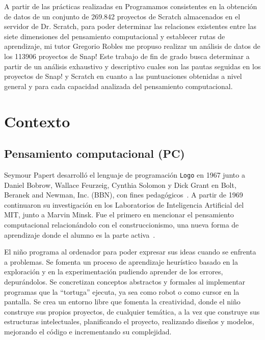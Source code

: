 \documentclass[a4paper, 12pt]{book}
\begin{document}
A partir de las prácticas realizadas en Programamos consistentes en la obtención de datos de un conjunto de 269.842 proyectos de Scratch almacenados en el servidor de Dr. Scratch, para poder determinar las relaciones existentes entre las siete dimensiones del pensamiento computacional y establecer rutas de aprendizaje, mi tutor Gregorio Robles me propuso realizar un análisis de datos de los 113906 proyectos de Snap! Este trabajo de fin de grado busca determinar a partir de un análisis exhaustivo y descriptivo cuales son las pautas seguidas en los proyectos de Snap! y Scratch en cuanto a las puntuaciones obtenidas a nivel general y para cada capacidad analizada del pensamiento computacional. 

\section{Contexto}
\label{sec:contexto}

\subsection{Pensamiento computacional (PC)}
\label{subsec:pc}
Seymour Papert desarrolló el lenguaje de programación \texttt{Logo} en 1967 junto a Daniel Bobrow, Wallace Feurzeig, Cynthia Solomon y Dick Grant en Bolt, Beranek and Newman, Inc. (BBN), con fines pedagógicos~\cite{solomon20:_history}. A partir de 1969 continuaron su investigación en los Laboratorios de Inteligencia Artificial del MIT, junto a Marvin Minsk. Fue el primero en mencionar el pensamiento computacional relacionándolo con el construccionismo, una nueva forma de aprendizaje donde el alumno es la parte activa~\cite{papert80:_mindstorm}.

El niño programa al ordenador para poder expresar sus ideas cuando se enfrenta a problemas. Se fomenta un proceso de aprendizaje heurístico basado en la exploración y en la experimentación pudiendo aprender de los errores, depurándolos. Se concretizan conceptos abstractos y formales al implementar programas que la ``tortuga'' ejecuta, ya sea como robot o como cursor en la pantalla. Se crea un entorno libre que fomenta la creatividad, donde el niño construye sus propios proyectos, de cualquier temática, a la vez que construye sus estructuras intelectuales, planificando el proyecto, realizando diseños y modelos, mejorando el código e incrementando su complejidad.
\end{document}
